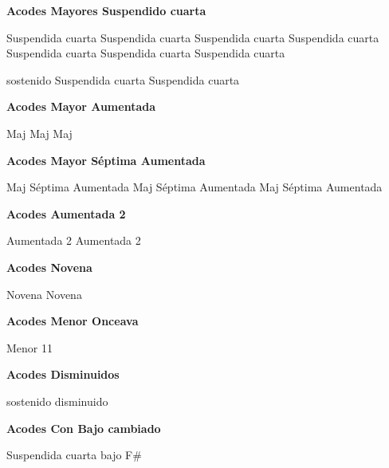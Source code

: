 \vskip 20pt
\textbf{Acodes Mayores Suspendido cuarta}
\vskip 25pt

\small
{} Suspendida cuarta
 Suspendida cuarta
 Suspendida cuarta
 Suspendida cuarta
 Suspendida cuarta
 Suspendida cuarta
 Suspendida cuarta

 sostenido Suspendida cuarta
 Suspendida cuarta
\normalsize

\vskip 20pt
\textbf{Acodes Mayor Aumentada}
\vskip 25pt

\small
{} Maj
 Maj
 Maj
\normalsize

\vskip 20pt
\textbf{Acodes Mayor S\'eptima Aumentada}
\vskip 25pt

\small
{} Maj S\'eptima Aumentada
 Maj S\'eptima Aumentada
 Maj S\'eptima Aumentada
\normalsize

\vskip 20pt
\textbf{Acodes Aumentada 2}
\vskip 25pt

\small
{} Aumentada 2
 Aumentada 2
\normalsize

\vskip 20pt
\textbf{Acodes Novena}
\vskip 25pt

\small
{} Novena
 Novena
\normalsize

\vskip 20pt
\textbf{Acodes Menor Onceava}
\vskip 25pt

\small
{} Menor 11
\normalsize

\vskip 20pt
\textbf{Acodes Disminuidos}
\vskip 25pt

\small
{} sostenido disminuido
\normalsize


\vskip 20pt
\textbf{Acodes Con Bajo cambiado}

\small
{}
\vskip 20pt
\vskip 20pt
\vskip 20pt
\vskip 20pt
\vskip 20pt
 Suspendida cuarta bajo F\#
\normalsize

